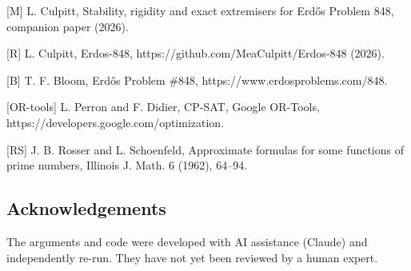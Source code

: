 \documentclass[
  11pt,
]{article}
\begin{document}
{[}M{]} L. Culpitt, Stability, rigidity and exact extremisers for Erdős
Problem 848, companion paper (2026).

{[}R{]} L. Culpitt, Erdos-848, https://github.com/MeaCulpitt/Erdos-848
(2026).

{[}B{]} T. F. Bloom, Erdős Problem \#848,
https://www.erdosproblems.com/848.

{[}OR-tools{]} L. Perron and F. Didier, CP-SAT, Google OR-Tools,
https://developers.google.com/optimization.

{[}RS{]} J. B. Rosser and L. Schoenfeld, Approximate formulas for some
functions of prime numbers, Illinois J. Math. 6 (1962), 64--94.

\subsection{Acknowledgements}

The arguments and code were developed with AI assistance (Claude) and
independently re-run. They have not yet been reviewed by a human expert.
\end{document}
